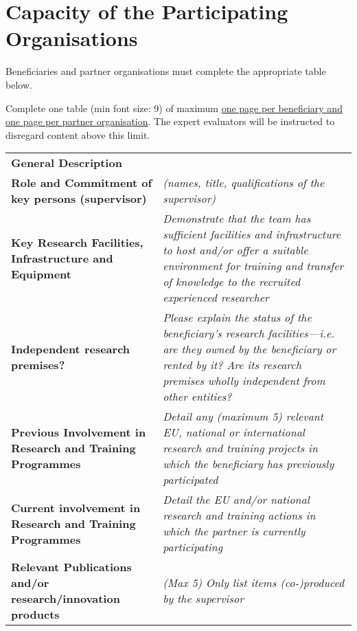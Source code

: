 \newpage
\section{Capacity of the Participating Organisations}
\label{sec:capacities}

Beneficiaries and partner organisations must complete the appropriate table below.

\medskip\noindent
Complete one table (min font size: 9) of maximum \ul{one page per beneficiary and one page per partner organisation}. 
The expert evaluators will be instructed to disregard content above this limit.
\vspace{\baselineskip}


\begin{table}[h!]
{\fontsize{9bp}{1em}\selectfont %
\noindent\begin{tabular}{|>{\raggedright}p{}|p{}|}\hline
  \multicolumn{2}{|l|}{\cellcolor{gray!50}\textbf{Beneficiary X}} \\\hline
\textbf{General Description} &

\\\hline
\textbf{Role and Commitment of key persons (supervisor)} &
{\em (names, title, qualifications of the supervisor)}
{\em }
\\\hline
\textbf{Key Research Facilities, Infrastructure and Equipment} &
{\em Demonstrate that the team has sufficient facilities and infrastructure to host and/or offer a suitable environment for training and transfer of knowledge to the recruited experienced researcher}
\\\hline
\textbf{Independent research premises?} &
{\em Please explain the status of the beneficiary's research facilities\----i.e. are they owned by the beneficiary or rented by it? Are its research premises wholly independent from other entities?}
\\\hline
\textbf{Previous Involvement in Research and Training Programmes} &
{\em Detail any (maximum 5) relevant EU, national or international research and training projects in which the beneficiary has previously participated}
\\\hline
\textbf{Current involvement in Research and Training Programmes} &
{\em Detail the EU and/or national research and training actions in which the partner is currently participating}
\\\hline
\textbf{Relevant Publications and/or research/innovation products} &
{\em (Max 5) Only list items (co-)produced by the supervisor}
\\\hline
\end{tabular}}
\end{table}

